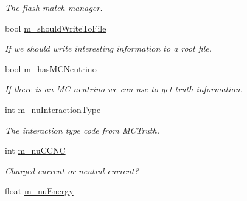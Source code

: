 \begin{DoxyCompactItemize}
\begin{DoxyCompactList}\small\item\em The flash match manager. \end{DoxyCompactList}\item 
\hypertarget{classflashmatch_1_1FlashMatchingTool_a4463e9c421fa26d464b037b125e0a11d}{bool \hyperlink{classflashmatch_1_1FlashMatchingTool_a4463e9c421fa26d464b037b125e0a11d}{m\-\_\-should\-Write\-To\-File}}\label{classflashmatch_1_1FlashMatchingTool_a4463e9c421fa26d464b037b125e0a11d}

\begin{DoxyCompactList}\small\item\em If we should write interesting information to a root file. \end{DoxyCompactList}\item 
\hypertarget{classflashmatch_1_1FlashMatchingTool_a6a48a0c7ba51c6383080aec264c41ea0}{bool \hyperlink{classflashmatch_1_1FlashMatchingTool_a6a48a0c7ba51c6383080aec264c41ea0}{m\-\_\-has\-M\-C\-Neutrino}}\label{classflashmatch_1_1FlashMatchingTool_a6a48a0c7ba51c6383080aec264c41ea0}

\begin{DoxyCompactList}\small\item\em If there is an M\-C neutrino we can use to get truth information. \end{DoxyCompactList}\item 
\hypertarget{classflashmatch_1_1FlashMatchingTool_af55fe95515811281eaabe0b127b73e10}{int \hyperlink{classflashmatch_1_1FlashMatchingTool_af55fe95515811281eaabe0b127b73e10}{m\-\_\-nu\-Interaction\-Type}}\label{classflashmatch_1_1FlashMatchingTool_af55fe95515811281eaabe0b127b73e10}

\begin{DoxyCompactList}\small\item\em The interaction type code from M\-C\-Truth. \end{DoxyCompactList}\item 
\hypertarget{classflashmatch_1_1FlashMatchingTool_af149140ded5d54d8a16d57bcb7bcef9f}{int \hyperlink{classflashmatch_1_1FlashMatchingTool_af149140ded5d54d8a16d57bcb7bcef9f}{m\-\_\-nu\-C\-C\-N\-C}}\label{classflashmatch_1_1FlashMatchingTool_af149140ded5d54d8a16d57bcb7bcef9f}

\begin{DoxyCompactList}\small\item\em Charged current or neutral current? \end{DoxyCompactList}\item 
\hypertarget{classflashmatch_1_1FlashMatchingTool_a8fd18741587d821f70572d0accc70def}{float \hyperlink{classflashmatch_1_1FlashMatchingTool_a8fd18741587d821f70572d0accc70def}{m\-\_\-nu\-Energy}}\label{classflashmatch_1_1FlashMatchingTool_a8fd18741587d821f70572d0accc70def}


\end{DoxyCompactItemize}
